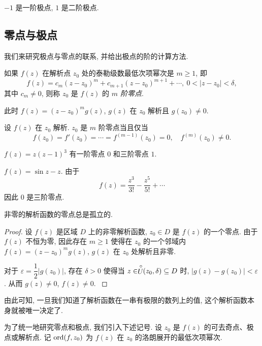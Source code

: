 \begin{answer}
	$-1$ 是一阶极点, $1$ 是二阶极点.
\end{answer}

\subsection{零点与极点}

我们来研究极点与零点的联系, 并给出极点的阶的计算方法.
\begin{definition}
	如果 $f(z)$ 在解析点 $z_0$ 处的泰勒级数最低次项幂次是 $m\ge1$, 即
	\[f(z)=c_m(z-z_0)^m+c_{m+1}(z-z_0)^{m+1}+\cdots,\ 0<|z-z_0|<\delta,\]
	其中 $c_m\neq 0$, 则称 $z_0$ 是 $f(z)$ 的 \emph{$m$ 阶零点}.
\end{definition}

此时 $f(z)=(z-z_0)^mg(z)$, $g(z)$ 在 $z_0$ 解析且 $g(z_0)\neq 0$.

\begin{theorem}
	设 $f(z)$ 在 $z_0$ 解析.
	$z_0$ 是 $m$ 阶零点当且仅当
	\[f(z_0)=f'(z_0)=\cdots=f^{(m-1)}(z_0)=0,\quad
	f^{(m)}(z_0)\neq 0.\]
\end{theorem}

\begin{example}
		$f(z)=z(z-1)^3$
	{有一阶零点 $0$ 和三阶零点 $1$.
	}
\end{example}

\begin{example}
		$f(z)=\sin z-z$.
	{由于
		\[f(z)=\frac{z^3}{3!}-\frac{z^5}{5!}+\cdots\]
		因此 $0$ 是三阶零点.
	}
\end{example}

\begin{theorem}
非零的解析函数的零点总是孤立的.
\end{theorem}

\begin{proof}
	设 $f(z)$ 是区域 $D$ 上的非零解析函数, $z_0\in D$ 是 $f(z)$ 的一个零点.
{%
	由于 $f(z)$ 不恒为零, 因此存在 $m\ge 1$ 使得在 $z_0$ 的一个邻域内 $f(z)=(z-z_0)^m g(z)$, $g(z)$ 在 $z_0$ 处解析且非零.
}

{
	对于 $\varepsilon=\dfrac12|g(z_0)|$, 存在 $\delta>0$ 使得当 $z\in \stackrel{\circ}{U}\!\!(z_0,\delta)\subseteq D$ 时, $|g(z)-g(z_0)|<\varepsilon$.
}%
{%
	从而 $g(z)\neq0$, $f(z)\neq 0$.\qedhere
}
\end{proof}

由此可知, 一旦我们知道了解析函数在一串有极限的数列上的值, 这个解析函数本身就被唯一决定了.

为了统一地研究零点和极点, 我们引入下述记号.
设 $z_0$ 是 $f(z)$ 的可去奇点、极点或解析点.
记 ${\mathrm{ord}}(f,z_0)$ 为 $f(z)$ 在 $z_0$ 的洛朗展开的最低次项幂次.

